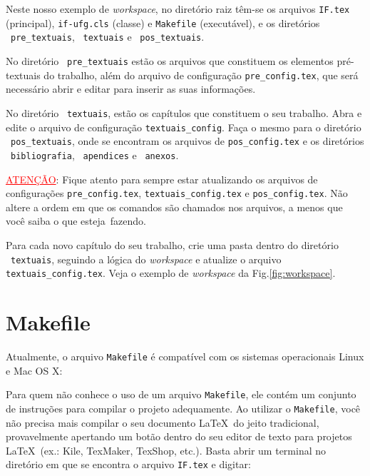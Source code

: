 Neste nosso exemplo de \emph{workspace}, no diretório raiz têm-se os arquivos \texttt{IF.tex} (principal), \texttt{if-ufg.cls} (classe) e \texttt{Makefile} (executável), e os diretórios \drawtikzfolder\ \texttt{pre\_textuais}, \mbox{\drawtikzfolder\ \texttt{textuais}} e \drawtikzfolder\ \texttt{pos\_textuais}. 

No diretório \drawtikzfolder\ \texttt{pre\_textuais} estão os arquivos que constituem os elementos pré-textuais do trabalho, além do arquivo de configuração \texttt{pre\_config.tex}, que será necessário abrir e editar para inserir as suas informações.

No diretório \drawtikzfolder\ \texttt{textuais}, estão os capítulos que constituem o seu trabalho. Abra e edite o arquivo de configuração \texttt{textuais\_config}. Faça o mesmo para o diretório \mbox{\drawtikzfolder\ \texttt{pos\_textuais}}, onde se encontram os arquivos de \texttt{pos\_config.tex} e os diretórios \mbox{\drawtikzfolder\ \texttt{bibliografia}}, \drawtikzfolder\ \texttt{apendices} e \drawtikzfolder\ \texttt{anexos}.

\vspace{20pt}
\noindent
\textcolor{red}{\uline{ATENÇÃO}}: Fique atento para sempre estar atualizando os arquivos de configurações \texttt{pre\_config.tex}, \texttt{textuais\_config.tex} e \texttt{pos\_config.tex}. Não altere a ordem em que os comandos são chamados nos arquivos, a menos que você saiba o que \mbox{esteja fazendo.}
\vspace{20pt}

Para cada novo capítulo do seu trabalho, crie uma pasta dentro do diretório \mbox{\drawtikzfolder\ \texttt{textuais}}, seguindo a lógica do \emph{workspace} e atualize o arquivo \texttt{textuais\_config.tex}. Veja o exemplo de \emph{workspace} da Fig.\ref{fig:workspace}.

\section{Makefile}

Atualmente, o arquivo \texttt{Makefile} é compatível com os sistemas operacionais Linux e Mac OS X:


Para quem não conhece o uso de um arquivo \texttt{Makefile}, ele contém um conjunto de instruções para compilar o projeto adequamente. Ao utilizar o \texttt{Makefile}, você não precisa mais compilar o seu documento \LaTeX\ do jeito tradicional, provavelmente apertando um botão dentro do seu editor de texto para projetos \LaTeX\ (ex.: Kile, TexMaker, TexShop, etc.). Basta abrir um terminal no diretório em que se encontra o arquivo \texttt{IF.tex} e digitar:\vspace{15pt}

